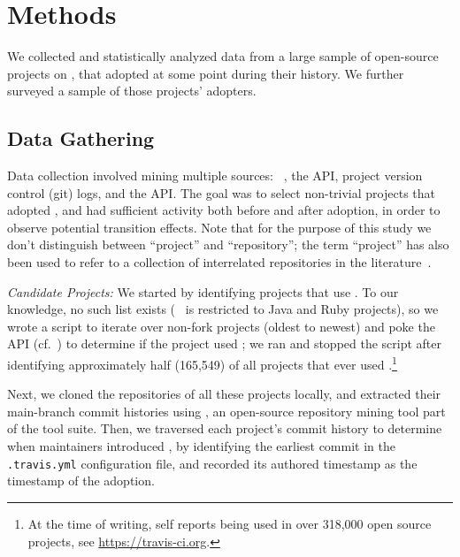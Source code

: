 
\section{Methods}
\label{sec:method}

We collected and statistically analyzed data from a large sample of open-source 
projects on \GH, that adopted \Tvis at some point during their history.
We further surveyed a sample of those projects' \Tvis adopters.

\subsection{Data Gathering}

Data collection involved mining multiple sources: \GHT~\cite{gousios2012ghtorrent}, 
the \GH API, project version control (git) logs, and the \Tvis API.
The goal was to select non-trivial projects that adopted \Tvis, and had sufficient
activity both before and after adoption, in order to observe potential transition effects.
Note that for the purpose of this study we don't distinguish between ``project'' 
and ``repository''; the term ``project'' has also been used to refer to a collection 
of interrelated repositories in the literature~\cite{vasilescu2016sky}.

\smallskip\noindent\emph{Candidate Projects:} 
We started by identifying \GH projects that use \Tvi.
To our knowledge, no such list exists 
(\TT~\cite{beller2017travistorrent} is restricted to Java and Ruby projects), so
we wrote a script to iterate over non-fork \GHT projects (oldest to newest)
and poke the \Tvis API (cf.\ \cite{era14}) to determine if the project used \Tvi;
we ran and stopped the script after identifying approximately half (165,549)
of all \GH projects that ever used \Tvis.\footnote{At the time of writing, \Tvi self 
reports being used in over 318,000 open source \GH projects, see 
\url{https://travis-ci.org}.} 

Next, we cloned the \GH repositories of all these projects locally, and extracted
their main-branch commit histories using \Perc, an open-source repository
mining tool part of the \GLab tool suite. %
Then, we traversed each project's commit history to determine when 
maintainers introduced \Tvis, by identifying the earliest commit in the 
\texttt{.travis.yml} configuration file, and recorded its authored timestamp as
the timestamp of the \Tvi adoption.

